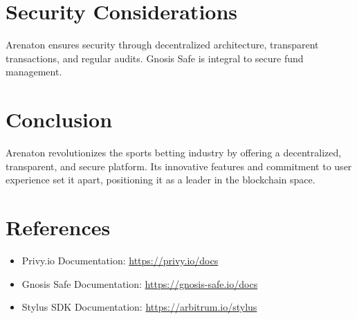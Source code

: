\documentclass[11pt,twocolumn]{article}
\begin{document}
\section{Security Considerations}
Arenaton ensures security through decentralized architecture, transparent transactions, and regular audits. Gnosis Safe is integral to secure fund management.

\section{Conclusion}
Arenaton revolutionizes the sports betting industry by offering a decentralized, transparent, and secure platform. Its innovative features and commitment to user experience set it apart, positioning it as a leader in the blockchain space.

\section*{References}
\begin{itemize}[itemsep=0.5em]
    \item Privy.io Documentation: \url{https://privy.io/docs}
    \item Gnosis Safe Documentation: \url{https://gnosis-safe.io/docs}
    \item Stylus SDK Documentation: \url{https://arbitrum.io/stylus}
\end{itemize}
\end{document}
